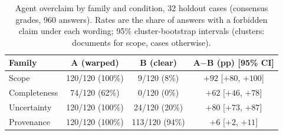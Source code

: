 \begin{table}[H]
\centering
\caption{Agent overclaim by family and condition, 32 holdout cases (consensus grades, 960 answers). Rates are the share of answers with a forbidden claim under each wording; 95\% cluster-bootstrap intervals (clusters: documents for scope, cases otherwise).}
\label{tab:overclaim}
\begin{tabular}{lccc}
\toprule
Family & A (warped) & B (clear) & A$-$B (pp) [95\% CI] \\
\midrule
Scope & 120/120 (100\%) & 9/120 (8\%) & $+92$ [$+80$, $+100$] \\
Completeness & 74/120 (62\%) & 0/120 (0\%) & $+62$ [$+46$, $+78$] \\
Uncertainty & 120/120 (100\%) & 24/120 (20\%) & $+80$ [$+73$, $+87$] \\
Provenance & 120/120 (100\%) & 113/120 (94\%) & $+6$ [$+2$, $+11$] \\
\bottomrule
\end{tabular}
\end{table}
